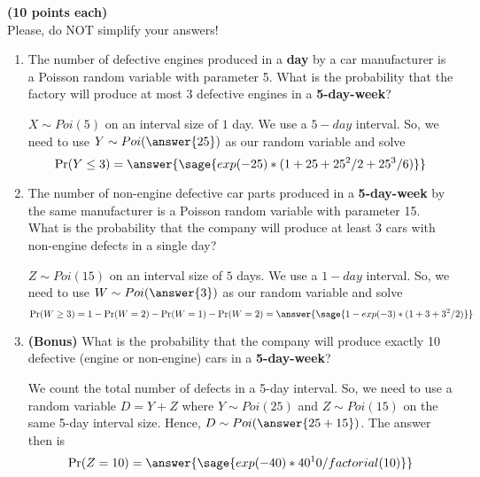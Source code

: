 \documentclass{ximera}
\begin{document}
\begin{problem}
{\bf (10 points each)} \\
\large Please, do NOT simplify your answers!
\begin{enumerate}
    \item The number of defective engines produced in a {\bf day} by a car manufacturer is a Poisson random variable with parameter 5. What is the probability that the factory will produce at most 3 defective engines in a {\bf 5-day-week}?

\begin{prompt}    
    $X\sim Poi(5)$ on an interval size of $1$ day. We use a $5-day$ interval. So, we need to use $Y\sim Poi(\answer{25})$ as our random variable and solve
    $$\Pr(Y\leq 3)=\answer{\sage{exp(-25)*(1+25+25^2/2+25^3/6)}}$$
\end{prompt}

    \item The number of non-engine defective car parts produced in a {\bf 5-day-week} by the same manufacturer is a Poisson random variable with parameter 15. What is the probability that the company will produce at least 3 cars with non-engine defects in a single day?

\begin{prompt}    
    $Z\sim Poi(15)$ on an interval size of $5$ days. We use a 
    $1-day$ interval. So, we need to use $W\sim Poi(\answer{3})$ as our random variable and solve
    $$\Pr(W\geq 3)=1-\Pr(W=2)-\Pr(W=1)-\Pr(W=2)=\answer{\sage{1-exp(-3)*(1+3+3^2/2)}}$$
\end{prompt}    

    \item {\bf (Bonus)} What is the probability that the company will produce exactly 10 defective (engine or non-engine) cars in a {\bf 5-day-week}?

\begin{prompt}    
We count the total number of defects in a 5-day interval. So, we need to use a random variable $D=Y+Z$ where $Y\sim Poi(25)$ and $Z\sim Poi(15)$ on the same 5-day interval size. Hence, $D\sim Poi(\answer{25+15})$. The answer then is
    $$\Pr(Z=10)=\answer{\sage{exp(-40)*40^10/factorial(10)}}$$
\end{prompt}    


\end{enumerate}
\end{problem}
\end{document}
